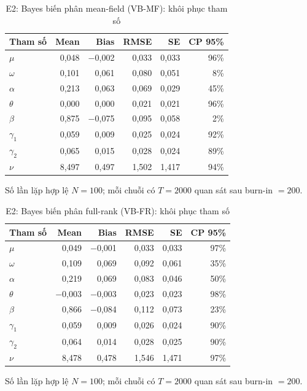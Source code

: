 \documentclass[11pt,a4paper]{article}
\begin{document}
\begin{table}[H]\centering\footnotesize
\caption{E2: Bayes biến phân mean-field (VB-MF): khôi phục tham số}\label{tab:E2-vb_mean_field}
\begin{tabular}{l r r r r r}
\toprule
\textbf{Tham số} & \textbf{Mean} & \textbf{Bias} & \textbf{RMSE} & \textbf{SE} & \textbf{CP 95\%} \\
\midrule
$\mu$ & 0,048 & $-$0,002 & 0,033 & 0,033 & 96\% \\
$\omega$ & 0,101 & 0,061 & 0,080 & 0,051 & 8\% \\
$\alpha$ & 0,213 & 0,063 & 0,069 & 0,029 & 45\% \\
$\theta$ & 0,000 & 0,000 & 0,021 & 0,021 & 96\% \\
$\beta$ & 0,875 & $-$0,075 & 0,095 & 0,058 & 2\% \\
$\gamma_1$ & 0,059 & 0,009 & 0,025 & 0,024 & 92\% \\
$\gamma_2$ & 0,065 & 0,015 & 0,028 & 0,024 & 89\% \\
$\nu$ & 8,497 & 0,497 & 1,502 & 1,417 & 94\% \\
\bottomrule
\end{tabular}
\par\vspace{0.25em}\begin{minipage}{0.95\textwidth}\scriptsize Số lần lặp hợp lệ $N=100$; mỗi chuỗi có $T=2000$ quan sát sau burn-in $=200$. \end{minipage}
\end{table}

\begin{table}[H]\centering\footnotesize
\caption{E2: Bayes biến phân full-rank (VB-FR): khôi phục tham số}\label{tab:E2-vb_full_rank}
\begin{tabular}{l r r r r r}
\toprule
\textbf{Tham số} & \textbf{Mean} & \textbf{Bias} & \textbf{RMSE} & \textbf{SE} & \textbf{CP 95\%} \\
\midrule
$\mu$ & 0,049 & $-$0,001 & 0,033 & 0,033 & 97\% \\
$\omega$ & 0,109 & 0,069 & 0,092 & 0,061 & 35\% \\
$\alpha$ & 0,219 & 0,069 & 0,083 & 0,046 & 50\% \\
$\theta$ & $-$0,003 & $-$0,003 & 0,023 & 0,023 & 98\% \\
$\beta$ & 0,866 & $-$0,084 & 0,112 & 0,073 & 23\% \\
$\gamma_1$ & 0,059 & 0,009 & 0,026 & 0,024 & 90\% \\
$\gamma_2$ & 0,064 & 0,014 & 0,028 & 0,025 & 90\% \\
$\nu$ & 8,478 & 0,478 & 1,546 & 1,471 & 97\% \\
\bottomrule
\end{tabular}
\par\vspace{0.25em}\begin{minipage}{0.95\textwidth}\scriptsize Số lần lặp hợp lệ $N=100$; mỗi chuỗi có $T=2000$ quan sát sau burn-in $=200$. \end{minipage}
\end{table}
\end{document}
